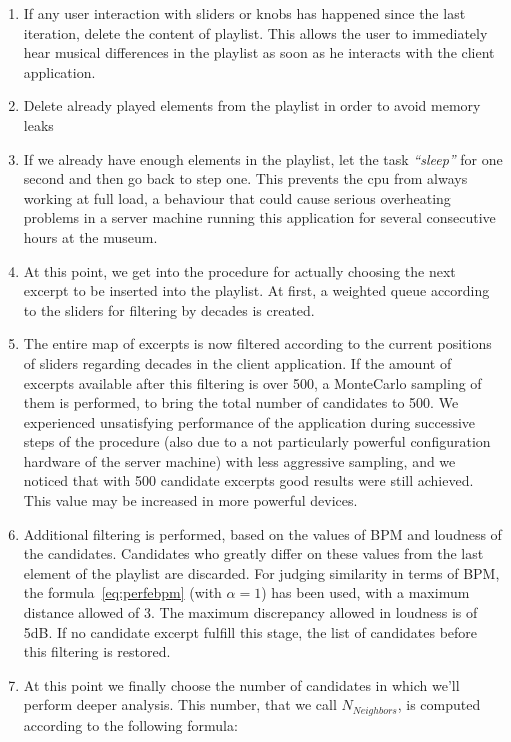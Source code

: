 \begin{enumerate}
\item If any user interaction with sliders or knobs has happened since the last iteration, delete the content of playlist. This allows the user to immediately hear musical differences in the playlist as soon as he interacts with the client application. 
\item Delete already played elements from the playlist in order to avoid memory leaks
\item If we already have enough elements in the playlist, let the task \textit{``sleep''} for one second and then go back to step one. This prevents the cpu from always working at full load, a behaviour that could cause serious overheating problems in a server machine running this application for several consecutive hours at the museum.
\item At this point, we get into the procedure for actually choosing the next excerpt to be inserted into the playlist. At first, a weighted queue according to the sliders for filtering by decades is created.
\item The entire map of excerpts is now filtered according to the current positions of sliders regarding decades in the client application. If the amount of excerpts available after this filtering is over 500, a MonteCarlo sampling of them is performed, to bring the total number of candidates to 500. We experienced unsatisfying performance of the application during successive steps of the procedure (also due to a not particularly powerful configuration hardware of the server machine) with less aggressive sampling, and we noticed that with 500 candidate excerpts good results were still achieved. This value may be increased in more powerful devices.
\item Additional filtering is performed, based on the values of BPM and loudness of the candidates. Candidates who greatly differ on these values from the last element of the playlist are discarded. For judging similarity in terms of BPM, the formula~\ref{eq:perfebpm} (with $\alpha = 1$) has been used, with a maximum distance allowed of 3. The maximum discrepancy allowed in loudness is of 5dB. If no candidate excerpt fulfill this stage, the list of candidates before this filtering is restored. 
\item At this point we finally choose the number of candidates in which we'll perform deeper analysis. This number, that we call $N_{Neighbors}$, is computed according to the following formula:
\begin{equation}

\end{equation}
\end{enumerate}
